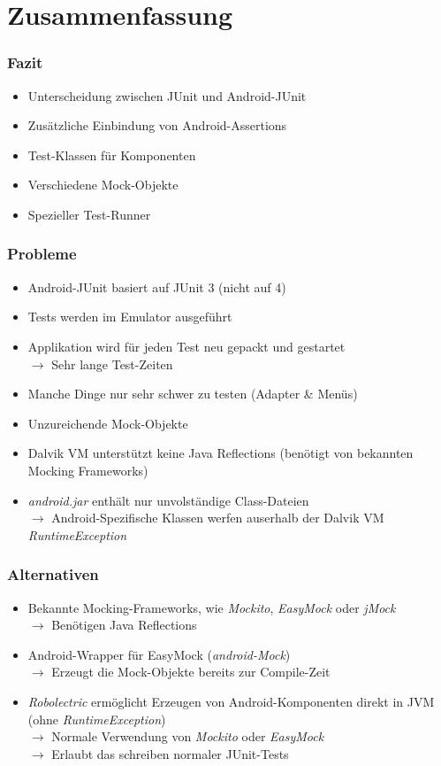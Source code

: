 \section{Zusammenfassung}
\begin{frame}
	\frametitle{Fazit}
	\begin{itemize}
		\item Unterscheidung zwischen JUnit und Android-JUnit
		\item Zusätzliche Einbindung von Android-Assertions
		\item Test-Klassen für Komponenten
		\item Verschiedene Mock-Objekte
		\item Spezieller Test-Runner
	\end{itemize}
\end{frame}

\begin{frame}
	\frametitle{Probleme}
	\begin{itemize}
		\item Android-JUnit basiert auf JUnit 3 (nicht auf 4)
		\item Tests werden im Emulator ausgeführt
		\item Applikation wird für jeden Test neu gepackt und gestartet\\
			$\rightarrow$ Sehr lange Test-Zeiten
		\item Manche Dinge nur sehr schwer zu testen (Adapter \& Menüs)
		\item Unzureichende Mock-Objekte	
		\item Dalvik VM unterstützt keine Java Reflections 
			(benötigt von bekannten Mocking Frameworks)
		\item \emph{android.jar} enthält nur unvolständige Class-Dateien\\
			$\rightarrow$ Android-Spezifische Klassen werfen auserhalb der Dalvik VM 
			\emph{RuntimeException}
	\end{itemize}
\end{frame}

\begin{frame}
	\frametitle{Alternativen}
	\begin{itemize}
		\item Bekannte Mocking-Frameworks, wie \emph{Mockito}, \emph{EasyMock} 
			oder \emph{jMock} \\
			$\rightarrow$ Benötigen Java Reflections 
		\item Android-Wrapper für EasyMock (\emph{android-Mock}) \\
			$\rightarrow$ Erzeugt die Mock-Objekte bereits zur Compile-Zeit
		\item \emph{Robolectric} ermöglicht Erzeugen von Android-Komponenten 
			direkt in JVM (ohne \emph{RuntimeException}) \\
			$\rightarrow$ Normale Verwendung von \emph{Mockito} oder \emph{EasyMock}\\
			$\rightarrow$ Erlaubt das schreiben normaler JUnit-Tests
	\end{itemize}
\end{frame}

